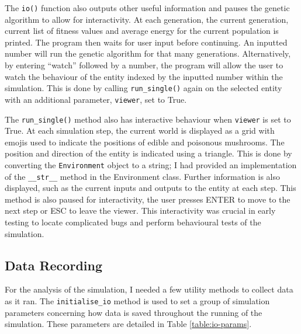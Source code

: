 \documentclass[12pt,a4paper,twoside,openright]{report}
\begin{document}
The \texttt{io()} function also outputs other useful information and pauses the genetic algorithm to allow for interactivity. At each generation, the current generation, current list of fitness values and average energy for the current population is printed. The program then waits for user input before continuing. An inputted number will run the genetic algorithm for that many generations. Alternatively, by entering ``watch'' followed by a number, the program will allow the user to watch the behaviour of the entity indexed by the inputted number within the simulation. This is done by calling \texttt{run\_single()} again on the selected entity with an additional parameter, \texttt{viewer}, set to True.

The \texttt{run\_single()} method also has interactive behaviour when \texttt{viewer} is set to True. At each simulation step, the current world is displayed as a grid with emojis used to indicate the positions of edible and poisonous mushrooms. The position and direction of the entity is indicated using a triangle. This is done by converting the \texttt{Environment} object to a string; I had provided an implementation of the \texttt{\_\_str\_\_} method in the Environment class. Further information is also displayed, such as the current inputs and outputs to the entity at each step. This method is also paused for interactivity, the user presses ENTER to move to the next step or ESC to leave the viewer. This interactivity was crucial in early testing to locate complicated bugs and perform behavioural tests of the simulation.

\subsection{Data Recording}

For the analysis of the simulation, I needed a few utility methods to collect data as it ran. The \texttt{initialise\_io} method is used to set a group of simulation parameters concerning how data is saved throughout the running of the simulation. These parameters are detailed in Table \ref{table:io-params}.
\end{document}
